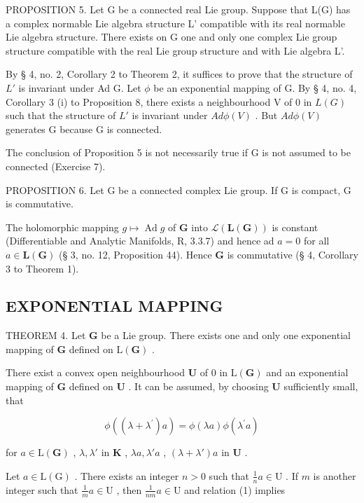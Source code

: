 PROPOSITION 5. Let G be a connected real Lie group. Suppose that L(G) has a complex normable Lie algebra structure L' compatible with its real normable Lie algebra structure. There exists on G one and only one complex Lie group structure compatible with the real Lie group structure and with Lie algebra L'.

By § 4, no. 2, Corollary 2 to Theorem 2, it suffices to prove that the structure of \(L'\) is invariant under Ad G. Let \(\phi\) be an exponential mapping of G. By § 4, no. 4, Corollary 3 (i) to Proposition 8, there exists a neighbourhood V of 0 in \(L(G)\) such that the structure of \(L'\) is invariant under \(Ad\phi(V)\) . But \(Ad\phi(V)\) generates G because G is connected.

The conclusion of Proposition 5 is not necessarily true if G is not assumed to be connected (Exercise 7).

PROPOSITION 6. Let G be a connected complex Lie group. If G is compact, G is commutative.

The holomorphic mapping \(g \mapsto \operatorname{Ad} g\) of \(\mathbf{G}\) into \(\mathcal{L}(\mathbf{L}(\mathbf{G}))\) is constant (Differentiable and Analytic Manifolds, R, 3.3.7) and hence ad \(a = 0\) for all \(a \in \mathbf{L}(\mathbf{G})\) (§ 3, no. 12, Proposition 44). Hence \(\mathbf{G}\) is commutative (§ 4, Corollary 3 to Theorem 1).

\subsection{EXPONENTIAL MAPPING}

THEOREM 4. Let \(\mathbf{G}\) be a Lie group. There exists one and only one exponential mapping of \(\mathbf{G}\) defined on \(\mathrm{L}(\mathbf{G})\) .

There exist a convex open neighbourhood \(\mathbf{U}\) of 0 in \(\mathrm{L}(\mathbf{G})\) and an exponential mapping of \(\mathbf{G}\) defined on \(\mathbf{U}\) . It can be assumed, by choosing \(\mathbf{U}\) sufficiently small, that

\[
\phi ((\lambda + \lambda^ {\prime}) a) = \phi (\lambda a) \phi (\lambda^ {\prime} a)\tag{1}
\]

for \(a \in \mathrm{L}(\mathbf{G})\) , \(\lambda, \lambda'\) in \(\mathbf{K}\) , \(\lambda a, \lambda'a\) , \((\lambda + \lambda')a\) in \(\mathbf{U}\) .

Let \(a \in \mathrm{L}(\mathrm{G})\) . There exists an integer \(n > 0\) such that \(\frac{1}{n} a \in \mathrm{U}\) . If \(m\) is another integer such that \(\frac{1}{m} a \in \mathrm{U}\) , then \(\frac{1}{nm} a \in \mathrm{U}\) and relation (1) implies

